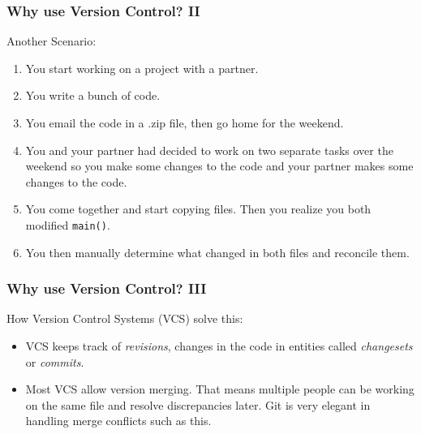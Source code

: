 \documentclass{lug}
\begin{document}
\begin{frame}
    \frametitle{Why use Version Control? II}

    Another Scenario:

    \begin{enumerate}[<+->]
        \item You start working on a project with a partner.
        \item You write a bunch of code.
        \item You email the code in a .zip file, then go home for the weekend.
        \item You and your partner had decided to work on two separate tasks
            over the weekend so you make some changes to the code and your
            partner makes some changes to the code.
        \item You come together and start copying files. Then you realize you
            both modified \texttt{main()}.
        \item You then manually determine what changed in both files and
            reconcile them.
    \end{enumerate}

\end{frame}

\begin{frame}
    \frametitle{Why use Version Control? III}

    How Version Control Systems (VCS) solve this:

    \begin{itemize}[<+->]
        \item VCS keeps track of \textit{revisions}, changes in the code in
            entities called \textit{changesets} or \textit{commits}.
        \item Most VCS allow version merging. That means multiple people can be
            working on the same file and resolve discrepancies later. Git is
            very elegant in handling merge conflicts such as this.
    \end{itemize}
\end{frame}
\end{document}
